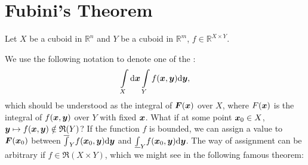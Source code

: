 \documentclass[openany]{book}
\begin{document}
\section{Fubini's Theorem}

Let $X$ be a cuboid in $\mathbb R^n$ and $Y$ be a cuboid in $\mathbb R^m$, $f \in \mathbb R^{X \times Y}$. 

We use the following notation to denote one of the :
\begin{equation*}
	\int\limits_X \mathrm{d} \boldsymbol{x} \int\limits_Y  f(\boldsymbol{x}, \boldsymbol{y})  \mathrm{d} \boldsymbol{y}, 
\end{equation*}
which should be understood as the integral of $\boldsymbol{F}(\boldsymbol{x})$ over $X$, where $F(\boldsymbol{x})$ is the integral of $f(\boldsymbol{x}, \boldsymbol{y})$ over $Y$ with fixed $\boldsymbol{x}$. 
What if at some point $\boldsymbol{x}_0 \in X$, $\boldsymbol{y} \mapsto f(\boldsymbol{x}, \boldsymbol{y}) \notin \mathfrak R(Y)$? 
If the function $f$ is bounded, we can assign a value to $\boldsymbol{F}(\boldsymbol{x}_0)$ between $\overline{\int}_Y f(\boldsymbol{x}_0, \boldsymbol{y}) \mathrm{d} \boldsymbol{y}$ and $\underline{\int}_Y f(\boldsymbol{x}_0, \boldsymbol{y}) \mathrm{d} \boldsymbol{y}$. 
The way of assignment can be arbitrary if $f \in \mathfrak R(X \times Y)$, which we might see in the following famous theorem:
\end{document}
